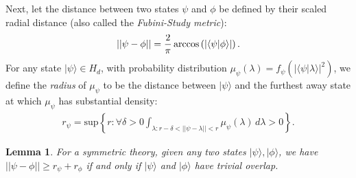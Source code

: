 \documentclass[letterpaper,11pt]{article}
\newtheorem{lem}{Lemma}
\newcommand{\ban}{\begin{eqnarray*}}
\newcommand{\ean}{\end{eqnarray*}}
\newcommand{\braket}[2]{\mbox{$ \langle #1 | #2 \rangle $}}
\begin{document}
Next, let the distance between two states $\psi$ and $\phi$ be defined by their scaled radial distance (also called the \emph{Fubini-Study metric}):
\ban ||\psi-\phi|| = \frac{2}{\pi}\arccos\left(|\braket{\psi}{\phi}|\right). \ean
For any state $ | \psi \rangle \in H_d$, with probability
distribution $\mu_{\psi}(\lambda)=f_{\psi}(| \langle \psi | \lambda
\rangle |^2)$, we define the \textit{radius} of $\mu_\psi$ to be the
distance between $ | \psi \rangle $ and the furthest away state at
which $\mu_\psi$ has substantial density:
\begin{eqnarray}
r_{\psi} = \mbox{sup}\left\{r: \forall \delta>0 \int_{\lambda: r-\delta
<||\psi-\lambda|| <r} \mu_\psi (\lambda) \,d \lambda >0 \right\}.
\label{defr}
\end{eqnarray}

\begin{lem}
\label{rsupp} For a symmetric theory, given any two states $ | \psi
\rangle, | \phi \rangle $, we have $||\psi-\phi||\geq
r_{\psi}+r_{\phi}$ if and only if $ | \psi \rangle $ and $ |
\phi \rangle $ have trivial overlap.
\end{lem}
\end{document}
